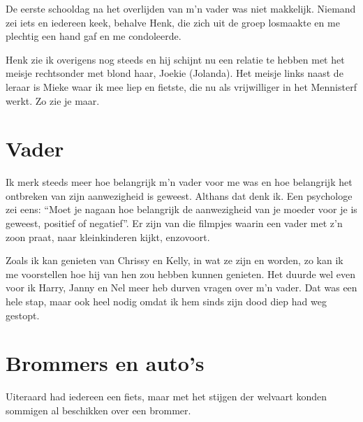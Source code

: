 \documentclass[10pt,twoside, openright]{memoir}
\begin{document}
De eerste schooldag na het overlijden van m’n vader was niet makkelijk. Niemand zei iets en iedereen keek, behalve Henk, die zich uit de groep losmaakte en me plechtig een hand gaf en me condoleerde. 

Henk zie ik overigens nog steeds en hij schijnt nu een relatie te hebben met het meisje rechtsonder met blond haar, Joekie (Jolanda). Het meisje links naast de leraar is Mieke waar ik mee liep en fietste, die nu als vrijwilliger in het Mennisterf werkt. Zo zie je maar.

\chapter{Vader} %
\label{cha:vader}

Ik merk steeds meer hoe belangrijk m'n vader voor me was en hoe belangrijk het ontbreken van zijn aanwezigheid is geweest. Althans dat denk ik. Een psychologe zei eens: ``Moet je nagaan hoe belangrijk de aanwezigheid van je moeder voor je is geweest, positief of negatief''. Er zijn van die filmpjes waarin een vader met z'n zoon praat, naar kleinkinderen kijkt, enzovoort.

Zoals ik kan genieten van Chrissy en Kelly, in wat ze zijn en worden, zo kan ik me voorstellen hoe hij van hen zou hebben kunnen genieten. Het duurde wel even voor ik Harry, Janny en Nel meer heb durven vragen over m'n vader. Dat was een hele stap, maar ook heel nodig omdat ik hem sinds zijn dood diep had weg gestopt. 

\chapter{Brommers en auto's} %
\label{cha:brommers_autos}

Uiteraard had iedereen een fiets, maar met het stijgen der welvaart konden sommigen al beschikken over een brommer. 
\end{document}
